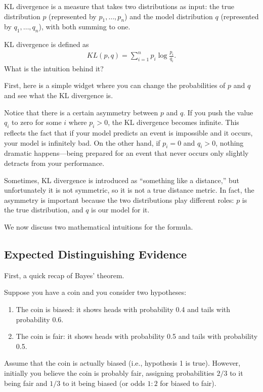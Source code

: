 \documentclass{article}
\begin{document}

KL divergence is a measure that takes two distributions as input: the true distribution \(p\) (represented by \(p_1, \dots, p_n\)) and the model distribution \(q\) (represented by \(q_1, \dots, q_n\)), with both summing to one.

KL divergence is defined as
\begin{align}
    \label{eq:kl_definition}
    KL(p, q) = \sum_{i = 1}^n p_i \log \frac{p_i}{q_i}.
\end{align}
What is the intuition behind it?

First, here is a simple widget where you can change the probabilities of \(p\) and \(q\) and see what the KL divergence is.

Notice that there is a certain asymmetry between \(p\) and \(q\). If you push the value \(q_i\) to zero for some \(i\) where \(p_i > 0\), the KL divergence becomes infinite. This reflects the fact that if your model predicts an event is impossible and it occurs, your model is infinitely bad. On the other hand, if \(p_i=0\) and \(q_i>0\), nothing dramatic happens—being prepared for an event that never occurs only slightly detracts from your performance.

Sometimes, KL divergence is introduced as ``something like a distance,'' but unfortunately it is not symmetric, so it is not a true distance metric. In fact, the asymmetry is important because the two distributions play different roles: \(p\) is the true distribution, and \(q\) is our model for it.

We now discuss two mathematical intuitions for the formula.

\subsection{Expected Distinguishing Evidence}

First, a quick recap of Bayes' theorem.

Suppose you have a coin and you consider two hypotheses:
\begin{enumerate}
    \item The coin is biased: it shows heads with probability 0.4 and tails with probability 0.6.
    \item The coin is fair: it shows heads with probability 0.5 and tails with probability 0.5.
\end{enumerate}
Assume that the coin is actually biased (i.e., hypothesis 1 is true). However, initially you believe the coin is probably fair, assigning probabilities \(2/3\) to it being fair and \(1/3\) to it being biased (or odds \(1:2\) for biased to fair).
\end{document}
